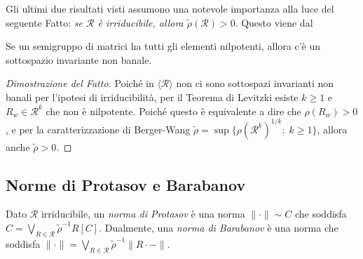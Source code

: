 Gli ultimi due risultati visti assumono una notevole importanza alla luce del seguente Fatto: \emph{se $\mathcal R$ è irriducibile, allora $\tilde\rho(\mathcal R)>0$}. Questo viene dal 
\begin{teorema}[di Levitzki]
	Se un semigruppo di matrici ha tutti gli elementi nilpotenti, allora c'è un sottospazio invariante non banale.
\end{teorema}
\begin{proof}[Dimostrazione del Fatto]
	Poiché in $\langle\mathcal R\rangle$ non ci sono sottospazi invarianti non banali per l'ipotesi di irriducibilità, per il Teorema di Levitzki esiste $k\geq1$ e $R_{w}\in\mathcal R^{k}$ che non è nilpotente. Poiché questo è equivalente a dire che $\rho(R_{w}) > 0$, e per la caratterizzazione di Berger-Wang $\tilde\rho = \sup\{\rho(\mathcal R^{k})^{1/k}:\; k\geq1\}$, allora anche $\tilde\rho>0$.
\end{proof}


\subsection{Norme di Protasov e Barabanov}

\begin{definizione}
	Dato $\mathcal R$ irriducibile, un \emph{norma di Protasov} è una norma $\|\cdot\|\sim C$ che soddisfa $C = \bigvee_{R\in\mathcal R}\tilde\rho^{-1}R[C]$.
	Dualmente, una \emph{norma di Barabanov} è una norma che soddisfa $\|\cdot\| = \bigvee_{R\in\mathcal R}\tilde\rho^{-1}\|R\cdot -\|$.
\end{definizione}

